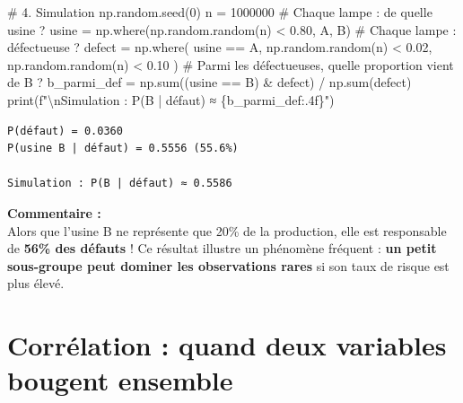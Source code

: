 \documentclass[
  french,
  11pt,
  a4paper,
]{scrbook}
\newenvironment{Shaded}{}{}
\newcommand{\BuiltInTok}[1]{\textcolor[rgb]{0.84,0.23,0.29}{#1}}
\newcommand{\CharTok}[1]{\textcolor[rgb]{0.01,0.18,0.38}{#1}}
\newcommand{\CommentTok}[1]{\textcolor[rgb]{0.42,0.45,0.49}{#1}}
\newcommand{\DecValTok}[1]{\textcolor[rgb]{0.00,0.36,0.77}{#1}}
\newcommand{\FloatTok}[1]{\textcolor[rgb]{0.00,0.36,0.77}{#1}}
\newcommand{\NormalTok}[1]{\textcolor[rgb]{0.14,0.16,0.18}{#1}}
\newcommand{\OperatorTok}[1]{\textcolor[rgb]{0.14,0.16,0.18}{#1}}
\newcommand{\SpecialCharTok}[1]{\textcolor[rgb]{0.00,0.36,0.77}{#1}}
\newcommand{\SpecialStringTok}[1]{\textcolor[rgb]{0.01,0.18,0.38}{#1}}
\newcommand{\StringTok}[1]{\textcolor[rgb]{0.01,0.18,0.38}{#1}}
\begin{document}
\begin{tcolorbox}
\begin{Shaded}
\begin{Highlighting}[]
\CommentTok{\# 4. Simulation}
\NormalTok{np.random.seed(}\DecValTok{0}\NormalTok{)}
\NormalTok{n }\OperatorTok{=} \DecValTok{1000000}
\CommentTok{\# Chaque lampe : de quelle usine ?}
\NormalTok{usine }\OperatorTok{=}\NormalTok{ np.where(np.random.random(n) }\OperatorTok{\textless{}} \FloatTok{0.80}\NormalTok{, }\StringTok{\textquotesingle{}A\textquotesingle{}}\NormalTok{, }\StringTok{\textquotesingle{}B\textquotesingle{}}\NormalTok{)}
\CommentTok{\# Chaque lampe : défectueuse ?}
\NormalTok{defect }\OperatorTok{=}\NormalTok{ np.where(}
\NormalTok{    usine }\OperatorTok{==} \StringTok{\textquotesingle{}A\textquotesingle{}}\NormalTok{,}
\NormalTok{    np.random.random(n) }\OperatorTok{\textless{}} \FloatTok{0.02}\NormalTok{,}
\NormalTok{    np.random.random(n) }\OperatorTok{\textless{}} \FloatTok{0.10}
\NormalTok{)}
\CommentTok{\# Parmi les défectueuses, quelle proportion vient de B ?}
\NormalTok{b\_parmi\_def }\OperatorTok{=}\NormalTok{ np.}\BuiltInTok{sum}\NormalTok{((usine }\OperatorTok{==} \StringTok{\textquotesingle{}B\textquotesingle{}}\NormalTok{) }\OperatorTok{\&}\NormalTok{ defect) }\OperatorTok{/}\NormalTok{ np.}\BuiltInTok{sum}\NormalTok{(defect)}
\BuiltInTok{print}\NormalTok{(}\SpecialStringTok{f"}\CharTok{\textbackslash{}n}\SpecialStringTok{Simulation : P(B | défaut) ≈ }\SpecialCharTok{\{}\NormalTok{b\_parmi\_def}\SpecialCharTok{:.4f\}}\SpecialStringTok{"}\NormalTok{)}
\end{Highlighting}
\end{Shaded}

\begin{verbatim}
P(défaut) = 0.0360
P(usine B | défaut) = 0.5556 (55.6%)

Simulation : P(B | défaut) ≈ 0.5586
\end{verbatim}

\textbf{Commentaire :}\\
Alors que l'usine B ne représente que 20\% de la production, elle est
responsable de \textbf{56\% des défauts} ! Ce résultat illustre un
phénomène fréquent : \textbf{un petit sous-groupe peut dominer les
observations rares} si son taux de risque est plus élevé.

\end{tcolorbox}

\chapter{Corrélation : quand deux variables bougent
ensemble}\label{corruxe9lation-quand-deux-variables-bougent-ensemble}
\end{document}
